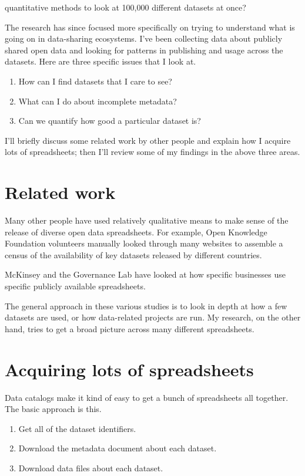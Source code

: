 \documentclass{acm_proc_article-sp}
\begin{document}
quantitative methods to look at 100,000 different datasets at once?

The research has since focused more specifically on trying to understand what
is going on in data-sharing ecosystems.
I've been collecting data about publicly shared open data
and looking for patterns in publishing and usage across the datasets.
Here are three specific issues that I look at.

\begin{enumerate}
\item How can I find datasets that I care to see?
\item What can I do about incomplete metadata?
\item Can we quantify how good a particular dataset is?
\end{enumerate}

I'll briefly discuss some related work by other people and explain how I
acquire lots of spreadsheets; then I'll review some of my findings in the
above three areas.

\section{Related work}
Many other people have used relatively qualitative means to make sense of
the release of diverse open data spreadsheets.
For example, Open Knowledge Foundation volunteers manually looked through
many websites to assemble a census \cite{open-data-census}
of the availability of key datasets released by different countries.

McKinsey \cite{mckinsey} and the Governance Lab \cite{govlab,joel}
have looked at how specific businesses use specific publicly available spreadsheets.

The general approach in these various studies is to look in depth at how a
few datasets are used, or how data-related projects are run. My research,
on the other hand, tries to get a broad picture across many different spreadsheets.

\section{Acquiring lots of spreadsheets}
Data catalogs make it kind of easy to get a bunch of spreadsheets all together.
The basic approach is this.

\begin{enumerate}
\item Get all of the dataset identifiers.
\item Download the metadata document about each dataset.
\item Download data files about each dataset.
\end{enumerate}
\end{document}
